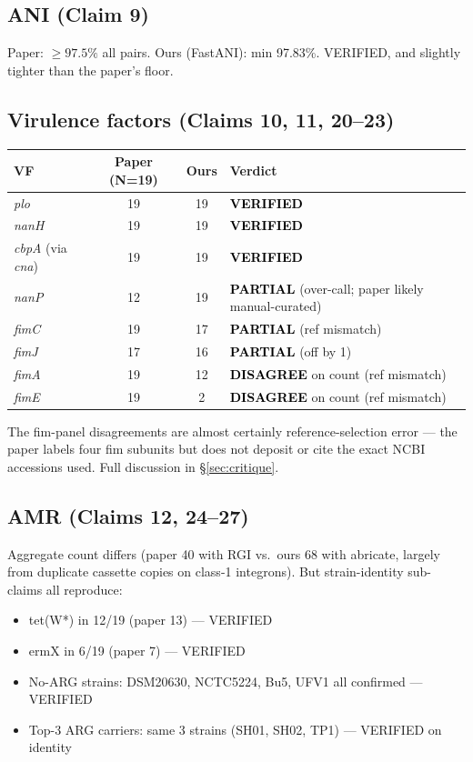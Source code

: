 \documentclass[11pt,a4paper]{article}
\newcommand{\verdict}[1]{\textbf{\textcolor{black}{#1}}}
\begin{document}
\subsection{ANI (Claim 9)}
Paper: $\geq 97.5\%$ all pairs. Ours (FastANI): min 97.83\%. VERIFIED, and slightly tighter than the paper's floor.

\subsection{Virulence factors (Claims 10, 11, 20--23)}
\begin{longtable}{@{}lccl@{}}
\toprule
VF & Paper (N=19) & Ours & Verdict \\
\midrule
\emph{plo} & 19 & 19 & \verdict{VERIFIED} \\
\emph{nanH} & 19 & 19 & \verdict{VERIFIED} \\
\emph{cbpA} (via \emph{cna}) & 19 & 19 & \verdict{VERIFIED} \\
\emph{nanP} & 12 & 19 & \verdict{PARTIAL} (over-call; paper likely manual-curated) \\
\emph{fimC} & 19 & 17 & \verdict{PARTIAL} (ref mismatch) \\
\emph{fimJ} & 17 & 16 & \verdict{PARTIAL} (off by 1) \\
\emph{fimA} & 19 & 12 & \verdict{DISAGREE} on count (ref mismatch) \\
\emph{fimE} & 19 & 2 & \verdict{DISAGREE} on count (ref mismatch) \\
\bottomrule
\end{longtable}
The fim-panel disagreements are almost certainly reference-selection error --- the paper labels four fim subunits but does not deposit or cite the exact NCBI accessions used. Full discussion in \S\ref{sec:critique}.

\subsection{AMR (Claims 12, 24--27)}
Aggregate count differs (paper 40 with RGI vs.\ ours 68 with abricate, largely from duplicate cassette copies on class-1 integrons). But strain-identity sub-claims all reproduce:
\begin{itemize}
\item tet(W*) in 12/19 (paper 13) --- VERIFIED
\item ermX in 6/19 (paper 7) --- VERIFIED
\item No-ARG strains: DSM20630, NCTC5224, Bu5, UFV1 all confirmed --- VERIFIED
\item Top-3 ARG carriers: same 3 strains (SH01, SH02, TP1) --- VERIFIED on identity
\end{itemize}
\end{document}
